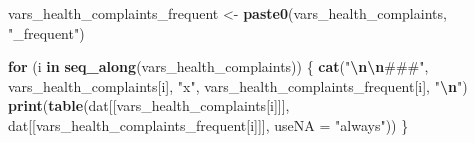 \documentclass[
]{article}
\newenvironment{Shaded}{\begin{snugshade}}{\end{snugshade}}
\newcommand{\AttributeTok}[1]{\textcolor[rgb]{0.13,0.29,0.53}{#1}}
\newcommand{\ControlFlowTok}[1]{\textcolor[rgb]{0.13,0.29,0.53}{\textbf{#1}}}
\newcommand{\FunctionTok}[1]{\textcolor[rgb]{0.13,0.29,0.53}{\textbf{#1}}}
\newcommand{\NormalTok}[1]{#1}
\newcommand{\OtherTok}[1]{\textcolor[rgb]{0.56,0.35,0.01}{#1}}
\newcommand{\SpecialCharTok}[1]{\textcolor[rgb]{0.81,0.36,0.00}{\textbf{#1}}}
\newcommand{\StringTok}[1]{\textcolor[rgb]{0.31,0.60,0.02}{#1}}
\begin{document}
\begin{Shaded}
\begin{Highlighting}[]
\NormalTok{vars\_health\_complaints\_frequent }\OtherTok{\textless{}{-}} \FunctionTok{paste0}\NormalTok{(vars\_health\_complaints,}
                                          \StringTok{"\_frequent"}\NormalTok{)}

\ControlFlowTok{for}\NormalTok{ (i }\ControlFlowTok{in} \FunctionTok{seq\_along}\NormalTok{(vars\_health\_complaints)) \{}
  \FunctionTok{cat}\NormalTok{(}\StringTok{"}\SpecialCharTok{\textbackslash{}n\textbackslash{}n}\StringTok{\#\#\#"}\NormalTok{, vars\_health\_complaints[i], }\StringTok{"x"}\NormalTok{, vars\_health\_complaints\_frequent[i], }\StringTok{"}\SpecialCharTok{\textbackslash{}n}\StringTok{"}\NormalTok{)}
  \FunctionTok{print}\NormalTok{(}\FunctionTok{table}\NormalTok{(dat[[vars\_health\_complaints[i]]], dat[[vars\_health\_complaints\_frequent[i]]], }\AttributeTok{useNA =} \StringTok{"always"}\NormalTok{))}
\NormalTok{\}}
\end{Highlighting}
\end{Shaded}
\end{document}
